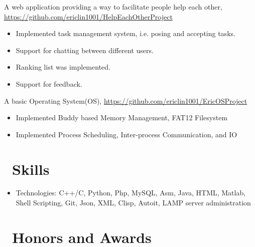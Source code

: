 \documentclass{resume}
\begin{document}
A web application providing a way to facilitate people help each other, \url{https://github.com/ericlin1001/HelpEachOtherProject}
\begin{itemize}
	\item Implemented task management system, i.e. posing and accepting tasks.
\item Support for chatting between different users.
\item Ranking list was implemented.
\item Support for feedback.
\end{itemize}
A basic Operating System(OS), \url{https://github.com/ericlin1001/EricOSProject}
\begin{itemize}
	\item Implemented Buddy based Memory Management, FAT12 Filesystem
	\item Implemented Process Scheduling, Inter-process Communication, and IO
\end{itemize}



\section{\faCogs\ Skills}
\begin{itemize}[parsep=0.5ex]
	\item Technologies: C++/C, Python, Php, MySQL, Asm, Java, HTML, Matlab, Shell Scripting, Git, Json, XML, Clisp, Autoit, LAMP server administration
\end{itemize}

\section{\faHeartO\ Honors and Awards}
\end{document}
